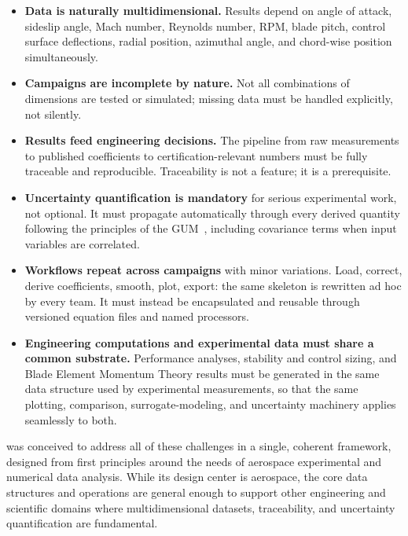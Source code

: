 \begin{itemize}
  \item \textbf{Data is naturally multidimensional.} Results depend on angle
    of attack, sideslip angle, Mach number, Reynolds number, RPM, blade
    pitch, control surface deflections, radial position, azimuthal angle,
    and chord-wise position simultaneously.

  \item \textbf{Campaigns are incomplete by nature.} Not all combinations of
    dimensions are tested or simulated; missing data must be handled
    explicitly, not silently.

  \item \textbf{Results feed engineering decisions.} The pipeline from raw
    measurements to published coefficients to certification-relevant numbers
    must be fully traceable and reproducible. Traceability is not a feature;
    it is a prerequisite.

  \item \textbf{Uncertainty quantification is mandatory} for serious
    experimental work, not optional. It must propagate automatically through
    every derived quantity following the principles of the
    GUM~\citep{gum2008}, including covariance terms when input variables are
    correlated.

  \item \textbf{Workflows repeat across campaigns} with minor variations.
    Load, correct, derive coefficients, smooth, plot, export: the same
    skeleton is rewritten ad hoc by every team. It must instead be
    encapsulated and reusable through versioned equation files and named
    processors.

  \item \textbf{Engineering computations and experimental data must share a
    common substrate.} Performance analyses, stability and control sizing,
    and Blade Element Momentum Theory results must be generated in the same
    data structure used by experimental measurements, so that the same
    plotting, comparison, surrogate-modeling, and uncertainty machinery
    applies seamlessly to both.
\end{itemize}

\itc{} was conceived to address all of these challenges in a single, coherent
framework, designed from first principles around the needs of aerospace
experimental and numerical data analysis. While its design center is
aerospace, the core data structures and operations are general enough to
support other engineering and scientific domains where multidimensional
datasets, traceability, and uncertainty quantification are fundamental.

